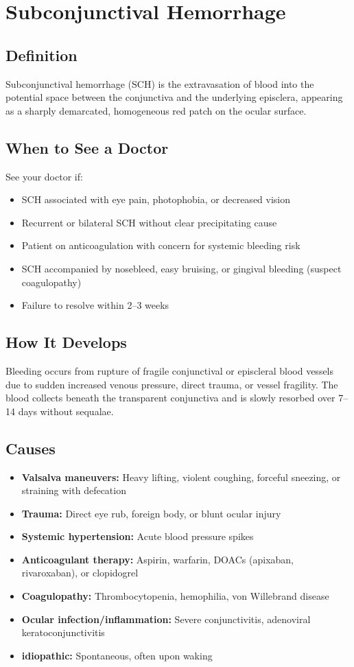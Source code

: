\chapter{Subconjunctival Hemorrhage}

\section*{Definition}
Subconjunctival hemorrhage (SCH) is the extravasation of blood into the potential space between the conjunctiva and the underlying episclera, appearing as a sharply demarcated, homogeneous red patch on the ocular surface.

\section*{When to See a Doctor}
See your doctor if:
\begin{itemize}
  \item SCH associated with eye pain, photophobia, or decreased vision
  \item Recurrent or bilateral SCH without clear precipitating cause
  \item Patient on anticoagulation with concern for systemic bleeding risk
  \item SCH accompanied by nosebleed, easy bruising, or gingival bleeding (suspect coagulopathy)
  \item Failure to resolve within 2--3 weeks
\end{itemize}

\section*{How It Develops}
Bleeding occurs from rupture of fragile conjunctival or episcleral blood vessels due to sudden increased venous pressure, direct trauma, or vessel fragility. The blood collects beneath the transparent conjunctiva and is slowly resorbed over 7--14 days without sequalae.

\section*{Causes}
\begin{itemize}
  \item \textbf{Valsalva maneuvers:} Heavy lifting, violent coughing, forceful sneezing, or straining with defecation
  \item \textbf{Trauma:} Direct eye rub, foreign body, or blunt ocular injury
  \item \textbf{Systemic hypertension:} Acute blood pressure spikes
  \item \textbf{Anticoagulant therapy:} Aspirin, warfarin, DOACs (apixaban, rivaroxaban), or clopidogrel
  \item \textbf{Coagulopathy:} Thrombocytopenia, hemophilia, von Willebrand disease
  \item \textbf{Ocular infection/inflammation:} Severe conjunctivitis, adenoviral keratoconjunctivitis
  \item \textbf{idiopathic:} Spontaneous, often upon waking
\end{itemize}

